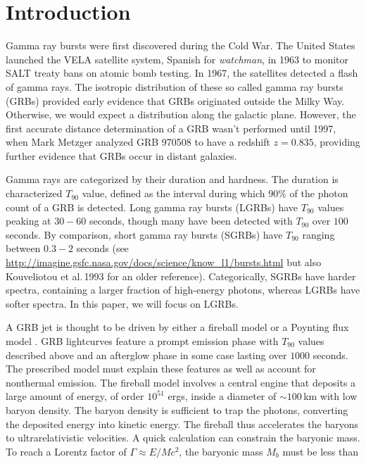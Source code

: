 \documentclass{article}
\begin{document}
\newpage
\thispagestyle{empty}
\mbox{}
\newpage

{\centering\tableofcontents}
\setcounter{page}{1}
\newpage
\thispagestyle{empty}
\mbox{}
\newpage

\section{Introduction}
Gamma ray bursts were first discovered during the Cold War. The United States launched the VELA satellite system, Spanish for \textit{watchman}, in 1963 to monitor SALT treaty bans on atomic bomb testing. In 1967, the satellites detected a flash of gamma rays. The isotropic distribution of these so called gamma ray bursts (GRBs) provided early evidence that GRBs originated outside the Milky Way. Otherwise, we would expect a distribution along the galactic plane. However, the first accurate distance determination of a GRB wasn't performed until 1997, when Mark Metzger analyzed GRB 970508 to have a redshift $z=0.835$, providing further evidence that GRBs occur in distant galaxies.

Gamma rays are categorized by their duration and hardness. The duration is characterized $T_{90}$ value, defined as the interval during which $90\%$ of the photon count of a GRB is detected. Long gamma ray bursts (LGRBs) have $T_{90}$ values peaking at $30-60$ seconds, though many have been detected with $T_{90}$ over $100$ seconds. By comparison, short gamma ray bursts (SGRBs) have $T_{90}$ ranging between $0.3-2$ seconds (see \url{http://imagine.gsfc.nasa.gov/docs/science/know_l1/bursts.html} but also Kouveliotou et al.\,1993 \cite{Kouv:1993ap} for an older reference). Categorically, SGRBs have harder spectra, containing a larger fraction of high-energy photons, whereas LGRBs have softer spectra. In this paper, we will focus on LGRBs.

A GRB jet is thought to be driven by either a fireball model \cite{Rosswog:2007ap} or a Poynting flux model \cite{Metzger:2010pp}. GRB lightcurves feature a prompt emission phase with $T_{90}$ values described above and an afterglow phase in some case lasting over $1000$ seconds. The prescribed model must explain these features as well as account for nonthermal emission. The fireball model involves a central engine that deposits a large amount of energy, of order $10^{51}$ ergs, inside a diameter of $\sim 100$\,km with low baryon density. The baryon density is sufficient to trap the photons, converting the deposited energy into kinetic energy. The fireball thus accelerates the baryons to ultrarelativistic velocities. A quick calculation can constrain the baryonic mass. To reach a Lorentz factor of $\Gamma \approx E/M c^2$, the baryonic mass $M_b$ must be less than
\end{document}
